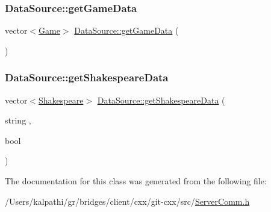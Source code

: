 \hypertarget{classbridges_1_1_server_comm_aaf9715981dcd976f93624bd3aa22183f}{}\label{classbridges_1_1_server_comm_aaf9715981dcd976f93624bd3aa22183f} 
\subsubsection{\texorpdfstring{Data\+Source\+::get\+Game\+Data}{DataSource::getGameData}}
{\footnotesize\ttfamily vector$<$\hyperlink{classbridges_1_1_game}{Game}$>$ \hyperlink{namespacebridges_1_1_data_source_a96a28cc7f2a6013fe09b07cc53c7432f}{Data\+Source\+::get\+Game\+Data} (\begin{DoxyParamCaption}{ }\end{DoxyParamCaption})\hspace{0.3cm}{\ttfamily [friend]}}

\hypertarget{classbridges_1_1_server_comm_a1f240eea3d39812606c0b3d10bdc757c}{}\label{classbridges_1_1_server_comm_a1f240eea3d39812606c0b3d10bdc757c} 
\subsubsection{\texorpdfstring{Data\+Source\+::get\+Shakespeare\+Data}{DataSource::getShakespeareData}}
{\footnotesize\ttfamily vector$<$\hyperlink{classbridges_1_1_shakespeare}{Shakespeare}$>$ \hyperlink{namespacebridges_1_1_data_source_abdf2e4d709e9b7f1a5370726676d86ec}{Data\+Source\+::get\+Shakespeare\+Data} (\begin{DoxyParamCaption}\item[{string}]{,  }\item[{bool}]{ }\end{DoxyParamCaption})\hspace{0.3cm}{\ttfamily [friend]}}



The documentation for this class was generated from the following file\+:\begin{DoxyCompactItemize}
\item 
/\+Users/kalpathi/gr/bridges/client/cxx/git-\/cxx/src/\hyperlink{_server_comm_8h}{Server\+Comm.\+h}\end{DoxyCompactItemize}
